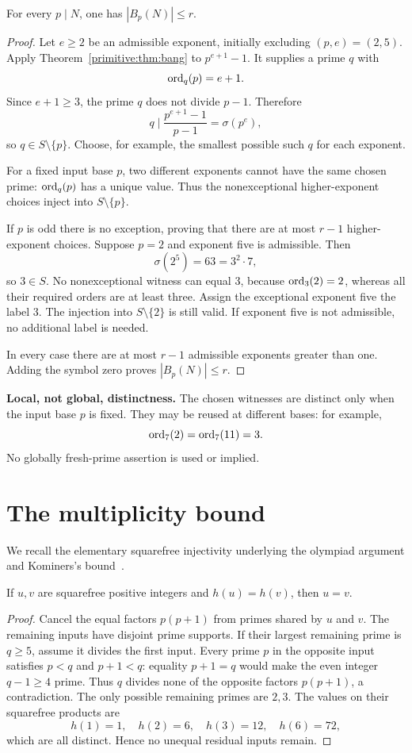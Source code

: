 \begin{lemma}\label{primitive:lem:listsize}
For every $p\mid N$, one has $|B_p(N)|\le r$.
\end{lemma}
\begin{proof}
Let $e\ge2$ be an admissible exponent, initially excluding $(p,e)=(2,5)$. Apply Theorem~\ref{primitive:thm:bang} to $p^{e+1}-1$. It supplies a prime $q$ with
\[
 \operatorname{ord}_q(p)=e+1.
\]
Since $e+1\ge3$, the prime $q$ does not divide $p-1$. Therefore
\[
 q\mid\frac{p^{e+1}-1}{p-1}=\sigma(p^e),
\]
so $q\in S\setminus\{p\}$. Choose, for example, the smallest possible such $q$ for each exponent.

For a fixed input base $p$, two different exponents cannot have the same chosen prime: $\operatorname{ord}_q(p)$ has a unique value. Thus the nonexceptional higher-exponent choices inject into $S\setminus\{p\}$.

If $p$ is odd there is no exception, proving that there are at most $r-1$ higher-exponent choices. Suppose $p=2$ and exponent five is admissible. Then
\[
 \sigma(2^5)=63=3^2\cdot7,
\]
so $3\in S$. No nonexceptional witness can equal $3$, because $\operatorname{ord}_3(2)=2$, whereas all their required orders are at least three. Assign the exceptional exponent five the label $3$. The injection into $S\setminus\{2\}$ is still valid. If exponent five is not admissible, no additional label is needed.

In every case there are at most $r-1$ admissible exponents greater than one. Adding the symbol zero proves $|B_p(N)|\le r$.
\end{proof}

\textbf{Local, not global, distinctness.} The chosen witnesses are distinct only when the input base $p$ is fixed. They may be reused at different bases: for example,
\[
 \operatorname{ord}_7(2)=\operatorname{ord}_7(11)=3.
\]
No globally fresh-prime assertion is used or implied.


\section{The multiplicity bound}
We recall the elementary squarefree injectivity underlying the olympiad argument and Kominers's bound~\cite{kominers}.

\begin{lemma}\label{primitive:lem:squarefree}
If $u,v$ are squarefree positive integers and $h(u)=h(v)$, then $u=v$.
\end{lemma}
\begin{proof}
Cancel the equal factors $p(p+1)$ from primes shared by $u$ and $v$. The remaining inputs have disjoint prime supports. If their largest remaining prime is $q\ge5$, assume it divides the first input. Every prime $p$ in the opposite input satisfies $p<q$ and $p+1<q$: equality $p+1=q$ would make the even integer $q-1\ge4$ prime. Thus $q$ divides none of the opposite factors $p(p+1)$, a contradiction. The only possible remaining primes are $2,3$. The values on their squarefree products are
\[
 h(1)=1,\quad h(2)=6,\quad h(3)=12,\quad h(6)=72,
\]
which are all distinct. Hence no unequal residual inputs remain.
\end{proof}

